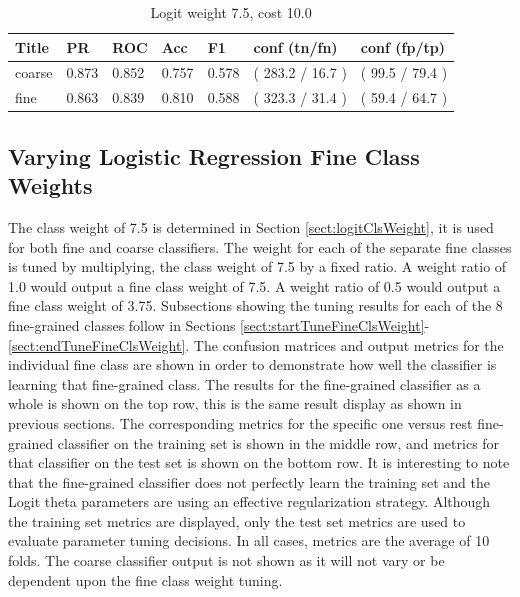 \documentclass[ms]{nuthesis}
\begin{document}
\FloatBarrier
\begin{table}[H]
\centering
\caption{Logit weight 7.5, cost 10.0}
\label{tab:LogRegWt7p5-C10}
\begin{tabular}{|l||l||l||l||l||l||l|}\toprule
Title & PR & ROC & Acc & F1 & conf (tn/fn) & conf (fp/tp) \\ \midrule
coarse & 0.873 & 0.852 & 0.757 & 0.578 & ( 283.2 / 16.7 ) & ( 99.5 / 79.4 ) \\
fine & 0.863 & 0.839 & 0.810 & 0.588 & ( 323.3 / 31.4 ) & ( 59.4 / 64.7 ) \\ \bottomrule
\end{tabular}
\end{table}
\FloatBarrier



\subsection{Varying Logistic Regression Fine Class Weights}
\par The class weight of 7.5 is
determined in Section \ref{sect:logitClsWeight}, it is used for both fine and coarse classifiers.
The weight for each of the separate fine classes is tuned by multiplying,
the class weight of 7.5 by a fixed ratio. A
weight ratio of 1.0 would output a fine class weight of 7.5. A weight ratio of
 0.5 would output a fine class weight of 3.75. Subsections showing the tuning results
 for each of the 8 fine-grained classes follow in Sections
 \ref{sect:startTuneFineClsWeight}-\ref{sect:endTuneFineClsWeight}. The confusion matrices and
 output metrics for the individual
 fine class are shown in order to demonstrate how well the classifier is learning that
 fine-grained class. The results for the fine-grained classifier as a whole is shown on the top row, this is the same
 result display as shown in previous sections. The corresponding metrics for the specific one versus rest fine-grained
 classifier on the training set is shown in the middle row, and metrics for that classifier on the test set is shown
 on the bottom row. It is interesting to note that the fine-grained classifier does not perfectly learn the training
  set and the Logit theta parameters are using an effective regularization strategy. Although the training set metrics
  are displayed, only the test set metrics are used to evaluate parameter tuning decisions. In all cases,
  metrics are the average of 10 folds. The coarse classifier output
 is not shown as it will not vary or be dependent upon the fine class weight tuning.
\end{document}
